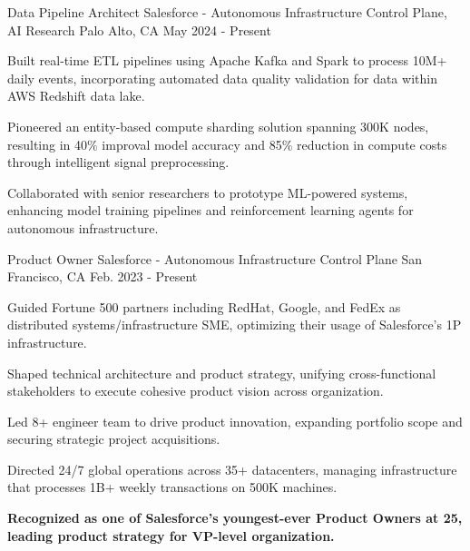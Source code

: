 

\renewcommand{\baselinestretch}{1.4} 
\begin{cventries}
  \cventry
    {Data Pipeline Architect}
    {Salesforce - Autonomous Infrastructure Control Plane, AI Research}
    {Palo Alto, CA}
    {May 2024 - Present}
    {
      \begin{cvitems}
        \item {Built real-time ETL pipelines using Apache Kafka and Spark to process 10M+ daily events, incorporating automated data quality validation for data within AWS Redshift data lake.}
        \item {Pioneered an entity-based compute sharding solution spanning 300K nodes, resulting in 40\% improval model accuracy and 85\% reduction in compute costs through intelligent signal preprocessing.}
        \item {Collaborated with senior researchers to prototype ML-powered systems, enhancing model training pipelines and reinforcement learning agents for autonomous infrastructure.}
      \end{cvitems}
    }

  \cventry
    {Product Owner}
    {Salesforce - Autonomous Infrastructure Control Plane}
    {San Francisco, CA}
    {Feb. 2023 - Present}
    {
      \begin{cvitems}
        \item {Guided Fortune 500 partners including RedHat, Google, and FedEx as distributed systems/infrastructure SME, optimizing their usage of Salesforce's 1P infrastructure.}
        \item {Shaped technical architecture and product strategy, unifying cross-functional stakeholders to execute cohesive product vision across organization.}
        \item {Led 8+ engineer team to drive product innovation, expanding portfolio scope and securing strategic project acquisitions.}
        \item {Directed 24/7 global operations across 35+ datacenters, managing infrastructure that processes 1B+ weekly transactions on 500K machines.}
        \item {\textbf{Recognized as one of Salesforce's youngest-ever Product Owners at 25, leading product strategy for VP-level organization.}}
      \end{cvitems}
    }


\end{cventries}
